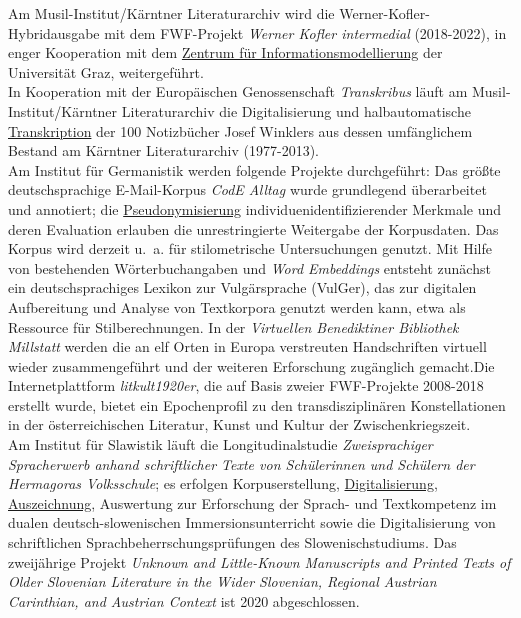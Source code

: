 \documentclass{article}
\begin{document}
        Am Musil-Institut/Kärntner Literaturarchiv wird die Werner-Kofler-Hybridausgabe mit dem FWF-Projekt \emph{Werner Kofler intermedial} (2018-2022), in enger Kooperation mit dem \href{http://gams.uni-graz.at/o:konde.217}{Zentrum für Informationsmodellierung} der Universität Graz, weitergeführt.\\
            
        In Kooperation mit der Europäischen Genossenschaft \emph{Transkribus} läuft am Musil-Institut/Kärntner Literaturarchiv die Digitalisierung und halbautomatische \href{http://gams.uni-graz.at/o:konde.197}{Transkription} der 100 Notizbücher Josef Winklers aus dessen umfänglichem Bestand am Kärntner Literaturarchiv (1977-2013).\\
            
        Am Institut für Germanistik werden folgende Projekte durchgeführt: Das größte deutschsprachige E-Mail-Korpus \emph{CodE Alltag} wurde grundlegend überarbeitet und annotiert; die \href{http://gams.uni-graz.at/o:konde.159}{Pseudonymisierung} individuenidentifizierender Merkmale und deren Evaluation erlauben die unrestringierte Weitergabe der Korpusdaten. Das Korpus wird derzeit u. a. für stilometrische Untersuchungen genutzt. Mit Hilfe von bestehenden Wörterbuchangaben und \emph{Word Embeddings} entsteht zunächst ein deutschsprachiges Lexikon zur Vulgärsprache (VulGer), das zur digitalen Aufbereitung und Analyse von Textkorpora genutzt werden kann, etwa als Ressource für Stilberechnungen. In der \emph{Virtuellen Benediktiner Bibliothek Millstatt} werden die an elf Orten in Europa verstreuten Handschriften virtuell wieder zusammengeführt und der weiteren Erforschung zugänglich gemacht.Die Internetplattform \emph{litkult1920er}, die auf Basis zweier FWF-Projekte 2008-2018 erstellt wurde, bietet ein Epochenprofil zu den transdisziplinären Konstellationen in der österreichischen Literatur, Kunst und Kultur der Zwischenkriegszeit.\\
            
        Am Institut für Slawistik läuft die Longitudinalstudie \emph{Zweisprachiger Spracherwerb anhand schriftlicher Texte von Schülerinnen und Schülern der Hermagoras Volksschule}; es erfolgen Korpuserstellung, \href{http://gams.uni-graz.at/o:konde.60}{Digitalisierung}, \href{http://gams.uni-graz.at/o:konde.17}{Auszeichnung}, Auswertung zur Erforschung der Sprach- und Textkompetenz im dualen deutsch-slowenischen Immersionsunterricht sowie die Digitalisierung von schriftlichen Sprachbeherrschungsprüfungen des Slowenischstudiums. Das zweijährige Projekt \emph{Unknown and Little-Known Manuscripts and Printed Texts of Older Slovenian Literature in the Wider Slovenian, Regional Austrian Carinthian, and Austrian Context} ist 2020 abgeschlossen.\\
            
\end{document}
